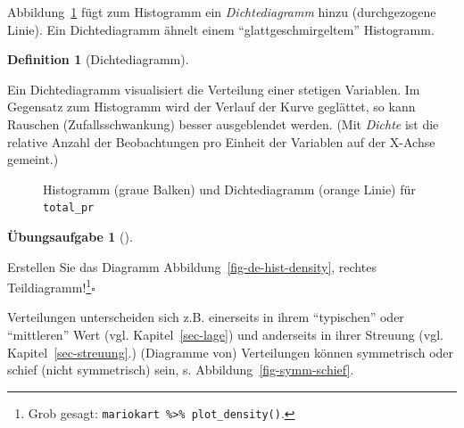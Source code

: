 \documentclass[
  letterpaper,
  oneside,
  open=any]{scrbook}
\theoremstyle{definition}
\newtheorem{exercise}{Übungsaufgabe}[chapter]
\theoremstyle{definition}
\theoremstyle{definition}
\newtheorem{definition}{Definition}[chapter]
\theoremstyle{remark}
\begin{document}
Abbildung~\ref{fig-balken-total-pr-hist-dens} fügt zum Histogramm ein
\emph{Dichtediagramm} hinzu (durchgezogene Linie). Ein Dichtediagramm
ähnelt einem \enquote{glattgeschmirgeltem} Histogramm.

\begin{definition}[Dichtediagramm]\protect\hypertarget{def-dichtediagramm}{}\label{def-dichtediagramm}

Ein Dichtediagramm visualisiert die Verteilung einer stetigen Variablen.
Im Gegensatz zum Histogramm wird der Verlauf der Kurve geglättet, so
kann Rauschen (Zufallsschwankung) besser ausgeblendet werden. (Mit
\emph{Dichte} ist die relative Anzahl der Beobachtungen pro Einheit der
Variablen auf der X-Achse gemeint.)

\end{definition}

\begin{figure}


\caption{\label{fig-balken-total-pr-hist-dens}Histogramm (graue Balken)
und Dichtediagramm (orange Linie) für \texttt{total\_pr}}

\end{figure}%

\begin{exercise}[]\protect\hypertarget{exr-plot-density}{}\label{exr-plot-density}

Erstellen Sie das Diagramm Abbildung~\ref{fig-de-hist-density}, rechtes
Teildiagramm!\footnote{Grob gesagt:
  \texttt{mariokart\ \%\textgreater{}\%\ plot\_density()}.}\(\square\)

\end{exercise}

Verteilungen unterscheiden sich z.B. einerseits in ihrem
\enquote{typischen} oder \enquote{mittleren} Wert (vgl.
Kapitel~\ref{sec-lage}) und anderseits in ihrer Streuung (vgl.
Kapitel~\ref{sec-streuung}.) (Diagramme von) Verteilungen können
symmetrisch oder schief (nicht symmetrisch) sein, s.
Abbildung~\ref{fig-symm-schief}.
\end{document}

